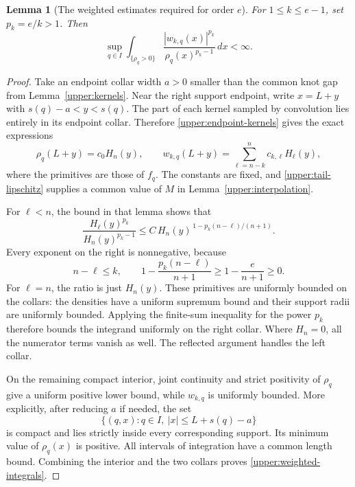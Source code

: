 \documentclass[11pt,letterpaper]{article}
\newtheorem{lemma}[theorem]{Lemma}
\theoremstyle{definition}
\theoremstyle{remark}
\begin{document}
\begin{lemma}[The weighted estimates required for order $e$]
\label{upper:weighted}
For $1\le k\le e-1$, set $p_k=e/k>1$.  Then
\begin{equation}\label{upper:weighted-integrals}
 \sup_{q\in I}
 \int_{\{\rho_q>0\}}
 \frac{|w_{k,q}(x)|^{p_k}}{\rho_q(x)^{p_k-1}}\,dx<\infty.
\end{equation}
\end{lemma}
\begin{proof}
Take an endpoint collar width $a>0$ smaller than the common knot gap from
Lemma~\ref{upper:kernels}.  Near the right support endpoint, write
$x=L+y$ with $s(q)-a<y<s(q)$.  The part of each kernel sampled by
convolution lies entirely in its endpoint collar.  Therefore
\eqref{upper:endpoint-kernels} gives the exact expressions
\[
 \rho_q(L+y)=c_0H_n(y),\qquad
 w_{k,q}(L+y)=\sum_{\ell=n-k}^{n}c_{k,\ell}H_\ell(y),
\]
where the primitives are those of $f_q$.  The constants are fixed, and
\eqref{upper:tail-lipschitz} supplies a common value of $M$ in
Lemma~\ref{upper:interpolation}.

For $\ell<n$, the bound in that lemma shows that
\[
 \frac{H_\ell(y)^{p_k}}{H_n(y)^{p_k-1}}
 \le C\,H_n(y)^{\,1-p_k(n-\ell)/(n+1)}.
\]
Every exponent on the right is nonnegative, because
\begin{equation}\label{upper:exponent-inequality}
 n-\ell\le k,\qquad
 1-\frac{p_k(n-\ell)}{n+1}
 \ge1-\frac e{n+1}\ge0.
\end{equation}
For $\ell=n$, the ratio is just $H_n(y)$.  These primitives are uniformly
bounded on the collars: the densities have a uniform supremum bound and
their support radii are uniformly bounded.  Applying the finite-sum
inequality for the power $p_k$ therefore bounds the integrand uniformly
on the right collar.  Where $H_n=0$, all the numerator terms vanish as
well.  The reflected argument handles the left collar.

On the remaining compact interior, joint continuity and strict positivity
of $\rho_q$ give a uniform positive lower bound, while $w_{k,q}$ is
uniformly bounded.  More explicitly, after reducing $a$ if needed, the
set
\[
 \{(q,x):q\in I,\ |x|\le L+s(q)-a\}
\]
is compact and lies strictly inside every corresponding support.  Its
minimum value of $\rho_q(x)$ is positive.  All intervals of integration
have a common length bound.  Combining the interior and the two collars
proves \eqref{upper:weighted-integrals}.
\end{proof}
\end{document}
